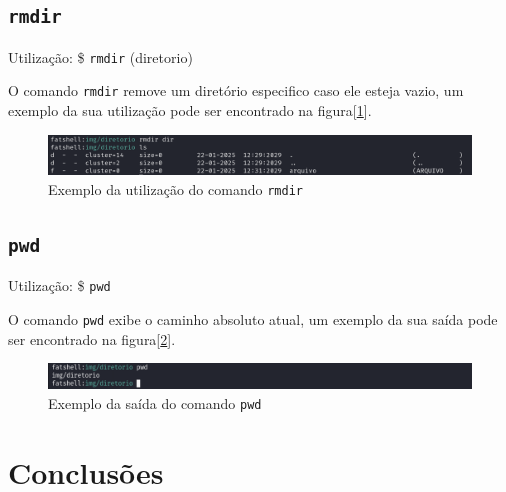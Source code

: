 \documentclass[
    12pt,				%
    oneside,   	        %
    a4paper,			%
    english,			%
    french,				%
    spanish,			%
    brazil,				%
    ]{pacotes/abntex2}
\begin{document}

\subsection{\texttt{rmdir}}
\label{subsec:rmdir}
Utilização: \$ \texttt{rmdir} (diretorio)

O comando \texttt{rmdir} remove um diretório especifico caso ele esteja vazio, um exemplo da sua utilização pode ser encontrado na figura[\ref{fig:rmdir}].

\begin{figure}[H]
    \centering
    \includegraphics[width=450pt]{figuras/resultados/17-rmdir.PNG}
    \caption{Exemplo da utilização do comando \texttt{rmdir}}
    \label{fig:rmdir}
\end{figure}


\subsection{\texttt{pwd}}
\label{subsec:pwd}
Utilização: \$ \texttt{pwd}

O comando \texttt{pwd} exibe o caminho absoluto atual, um exemplo da sua saída pode ser encontrado na figura[\ref{fig:pwd}].

\begin{figure}[H]
    \centering
    \includegraphics[width=450pt]{figuras/resultados/19-pwd.PNG}
    \caption{Exemplo da saída do comando \texttt{pwd}}
    \label{fig:pwd}
\end{figure}


\section{Conclusões}
\label{sec:conclusoes}

\postextual
\renewcommand{\bibsection}{%
\section{\bibname}
\bibmark
\prebibhook}


\end{document}
